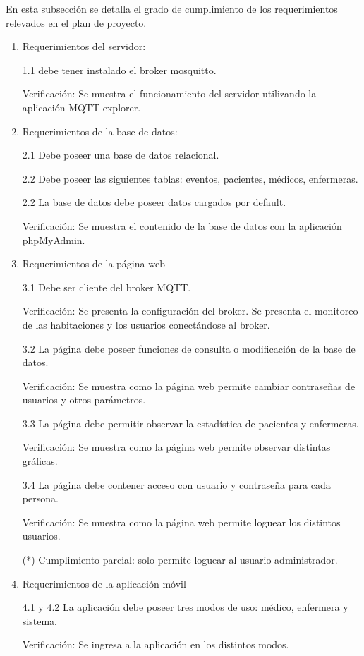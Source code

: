 En esta subsección se detalla el grado de cumplimiento de los requerimientos relevados en el plan de proyecto.
\begin{enumerate}
\item Requerimientos del servidor: 

1.1 debe tener instalado el broker mosquitto.

Verificación: Se muestra el funcionamiento del servidor utilizando la aplicación MQTT explorer.

\item Requerimientos de la base de datos: 

2.1 Debe poseer una base de datos relacional. 

2.2 Debe poseer las siguientes tablas: eventos, pacientes, médicos, enfermeras. 

2.2 La base de datos debe poseer datos cargados por default.

Verificación: Se muestra el contenido de la base de datos con la aplicación phpMyAdmin.

\item Requerimientos de la página web 

3.1 Debe ser cliente del broker MQTT. 

Verificación: Se presenta la configuración del broker. Se presenta el monitoreo de las habitaciones y los usuarios conectándose al broker.

3.2 La página debe poseer funciones de consulta o modificación de la base de datos.

Verificación: Se muestra como la página web permite cambiar contraseñas de usuarios y otros parámetros.

3.3 La página debe permitir observar la estadística de pacientes y enfermeras.

Verificación: Se muestra como la página web permite observar distintas gráficas.

3.4 La página debe contener acceso con usuario y contraseña para cada persona.


Verificación: Se muestra como la página web permite loguear los distintos usuarios.
 
(*) Cumplimiento parcial: solo permite loguear al usuario administrador.

\item Requerimientos de la aplicación móvil

4.1 y 4.2 La aplicación debe poseer tres modos de uso: médico, enfermera y sistema. 

Verificación: Se ingresa a la aplicación en los distintos modos.


\end{enumerate}

